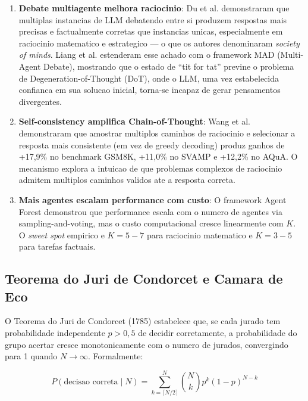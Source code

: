 \documentclass[5p]{elsarticle}
\begin{document}
\begin{enumerate}[label=(\arabic*)]
  \item \textbf{Debate multiagente melhora raciocinio}: Du et al. \cite{du2023} demonstraram que multiplas instancias de LLM debatendo entre si produzem respostas mais precisas e factualmente corretas que instancias unicas, especialmente em raciocinio matematico e estrategico — o que os autores denominaram \textit{society of minds}. Liang et al. \cite{liang2023} estenderam esse achado com o framework MAD (Multi-Agent Debate), mostrando que o estado de ``tit for tat'' previne o problema de Degeneration-of-Thought (DoT), onde o LLM, uma vez estabelecida confianca em sua solucao inicial, torna-se incapaz de gerar pensamentos divergentes.

  \item \textbf{Self-consistency amplifica Chain-of-Thought}: Wang et al. \cite{wang2023} demonstraram que amostrar multiplos caminhos de raciocinio e selecionar a resposta mais consistente (em vez de greedy decoding) produz ganhos de +17,9\% no benchmark GSM8K, +11,0\% no SVAMP e +12,2\% no AQuA. O mecanismo explora a intuicao de que problemas complexos de raciocinio admitem multiplos caminhos validos ate a resposta correta.

  \item \textbf{Mais agentes escalam performance com custo}: O framework Agent Forest \cite{agentforest2024} demonstrou que performance escala com o numero de agentes via sampling-and-voting, mas o custo computacional cresce linearmente com $K$. O \textit{sweet spot} empirico e $K = 5-7$ para raciocinio matematico e $K = 3-5$ para tarefas factuais.
\end{enumerate}

\subsection{Teorema do Juri de Condorcet e Camara de Eco}

O Teorema do Juri de Condorcet (1785) \cite{condorcet1785} estabelece que, se cada jurado tem probabilidade independente $p > 0,5$ de decidir corretamente, a probabilidade do grupo acertar cresce monotonicamente com o numero de jurados, convergindo para 1 quando $N \to \infty$. Formalmente:

\begin{equation}\label{eq:condorcet}
  P(\text{decisao correta} \mid N) = \sum_{k=\lceil N/2 \rceil}^{N}
  \binom{N}{k} p^k (1-p)^{N-k}
\end{equation}
\end{document}
